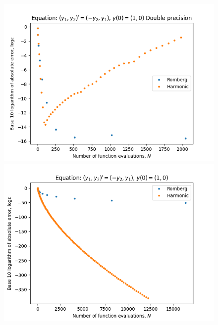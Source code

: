 \begin{figure}[H]
\centering
\begin{minipage}{0.45\textwidth}
\centering
\includegraphics[scale=0.45]{../results/emr_plots/rotation.png}
\end{minipage}
\begin{minipage}{0.45\textwidth}
\centering
\includegraphics[scale=0.45]{../results/emr_plots/rotation_hp.png}
\end{minipage}
\end{figure}

